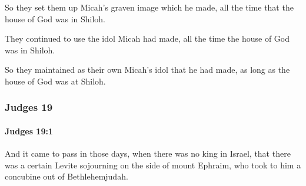 			\begin{versebox}
					\item[BHS] 
					\item[ASV] So they set them up Micah's graven image which he made, all the time that the house of God was in Shiloh.
					\item[NIV] They continued to use the idol Micah had made, all the time the house of God was in Shiloh.
					\item[NRSV] So they maintained as their own Micah’s idol that he had made, as long as the house of God was at Shiloh.
			\end{versebox}
	\subsubsection{Judges 19} %
		\label{JUDGES-19}

		\paragraph{Judges 19:1} %
			\label{JUDGES-19-1}

			And it came to pass in those days, when there was no king in Israel, that there was a certain Levite sojourning on the side of mount Ephraim, who took to him a concubine out of Bethlehemjudah.

